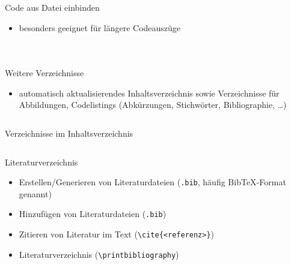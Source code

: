 \documentclass[presentation,aspectratio=169]{beamer}
\begin{document}
\begin{frame}[fragile]{Code aus Datei einbinden}
  \begin{itemize}
    \item besonders geeignet für längere Codeauszüge
  \end{itemize}
  \begin{columns}
    \begin{column}{.4\textwidth}
      
    \end{column}
    \begin{column}{.5\textwidth}
      \inputminted{latex}{codebeispiele/listings-from-file.tex}
    \end{column}
  \end{columns}
\end{frame}

\begin{frame}[fragile]{Weitere Verzeichnisse}
  \begin{itemize}
    \item automatisch aktualisierendes Inhaltsverzeichnis sowie Verzeichnisse für Abbildungen, Codelistings (Abkürzungen, Stichwörter, Bibliographie, \dots)
  \end{itemize}
  \inputminted{latex}{codebeispiele/list-of-everything.tex}
\end{frame}

\begin{frame}[fragile]{Verzeichnisse im Inhaltsverzeichnis}
  \inputminted{latex}{codebeispiele/lists-in-toc.tex}
\end{frame}

\begin{frame}[fragile]{Literaturverzeichnis}
  \begin{itemize}
    \item Erstellen/Generieren von Literaturdateien (\verb|.bib|, häufig Bib\TeX{}-Format genannt)
    \item Hinzufügen von Literaturdateien (\verb|.bib|)
    \item Zitieren von Literatur im Text (\verb|\cite{<referenz>}|)
    \item Literaturverzeichnis (\verb|\printbibliography|)
  \end{itemize}
\end{frame}
\end{document}
